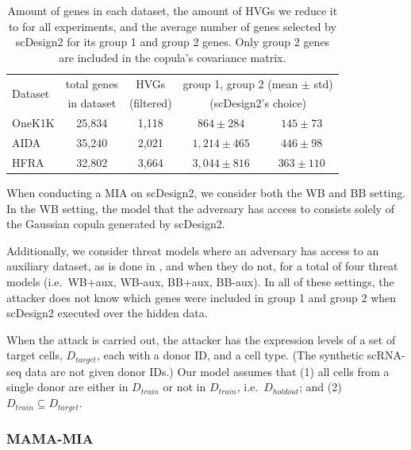 \documentclass[unnumsec,webpdf,contemporary,large]{oup-authoring-template}%
\theoremstyle{thmstyleone}%
\theoremstyle{thmstyletwo}%
\theoremstyle{thmstylethree}%
\begin{document}
\begin{table}[h]
\centering
\small
\setlength{\tabcolsep}{4pt}
\begin{tabular}{l c|c|cc}
\toprule
\multirow{2}{*}{Dataset} & total genes & HVGs & \multicolumn{2}{c}{group 1,     group 2 (mean $\pm$ std)} \\
 & in dataset & (filtered) & \multicolumn{2}{c}{(scDesign2's choice)} \\
\midrule
OneK1K & 25{,}834 & 1{,}118 & $864 \pm 284$  & $145 \pm 73$  \\
AIDA   & 35{,}240 & 2{,}021 & $1{,}214 \pm 465$  & $446 \pm 98$  \\
HFRA   & 32{,}802 & 3{,}664 & $3{,}044 \pm 816$ & $363 \pm 110$ \\
\bottomrule
\end{tabular}
\caption{Amount of genes in each dataset, the amount of HVGs we reduce it to for all experiments, and the average number of genes selected by scDesign2 for its group 1 and group 2 genes. Only group 2 genes are included in the copula's covariance matrix.}
\label{tab:gene_counts_all}
\end{table}

When conducting a MIA on scDesign2, we consider both the WB and BB setting. In the WB setting, the model that the adversary has access to consists solely of the Gaussian copula generated by scDesign2. 

Additionally, we consider threat models where an adversary has access to an auxiliary dataset, as is done in \cite{allard2023snake,houssiau2022tapas}, and when they do not, for a total of four threat models (i.e.\ WB+aux, WB-aux, BB+aux, BB-aux). In all of these settings, the attacker does not know which genes were included in group 1 and group 2 when scDesign2 executed over the hidden data.

When the attack is carried out, the attacker has the expression levels of a set of target cells, $D_{target}$, each with a donor ID, and a cell type. (The synthetic scRNA-seq data are not given donor IDs.) Our model assumes that (1) all cells from a single donor are either in $D_{train}$ or not in $D_{train}$, i.e.\ $D_{holdout}$; and (2) $D_{train} \subseteq D_{target}$.


\subsubsection{MAMA-MIA}\label{sec:mamamia}
\end{document}
